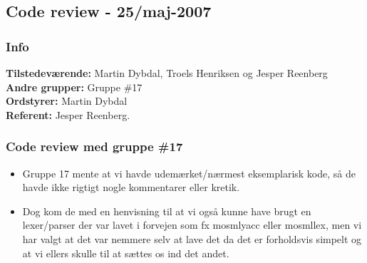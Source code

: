 \subsection{Code review - 25/maj-2007}

\subsubsection{Info}

\textbf{Tilstedeværende:} Martin Dybdal, Troels Henriksen og Jesper Reenberg\\
\textbf{Andre grupper:} Gruppe \#17\\
\textbf{Ordstyrer:} Martin Dybdal\\
\textbf{Referent:} Jesper Reenberg.

\subsubsection{Code review med gruppe \#17}

\begin{itemize}

\item Gruppe 17 mente at vi havde udemærket/nærmest eksemplarisk kode, så de havde ikke rigtigt nogle kommentarer eller kretik.

\item Dog kom de med en henvisning til at vi også kunne have brugt en lexer/parser der var lavet i forvejen som fx mosmlyacc eller mosmllex, men vi har valgt at det var nemmere selv at lave det da det er forholdsvis simpelt og at vi ellers skulle til at sættes os ind  det andet.

\end{itemize}

